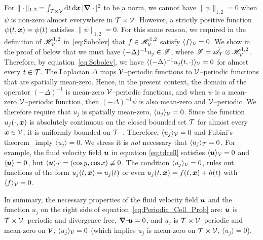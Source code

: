 \documentclass[amsa]{ipart}
\begin{document}
For $\|\cdot\|_{1,2}=\int_{\mathcal{T}\times\mathcal{V}}\mathrm{d} t\,\mathrm{d}\boldsymbol{x}\,|\mbox{\boldmath${\nabla}$}\cdot|^2$ to be a norm,
we cannot have $\|\psi\|_{1,2}=0$ 
when $\psi$ is non-zero almost everywhere in $\mathcal{T}\times\mathcal{V}$. However, a
strictly positive function $\psi(t,\boldsymbol{x})=\psi(t)$ satisfies
$\|\psi\|_{1,2}=0$. For this same reason, we required in the definition of
$\mathscr{H}^{1,2}_{\mathcal{V}}$ in~\eqref{eq:Sobolev} that $f\in\mathscr{H}^{1,2}_{\mathcal{V}}$
satisfy $\langle f\rangle_{\mathcal{V}}=0$.  We show in the proof of
 below that we must have $(-\Delta)^{-1}u_j\in\mathscr{F}$, 
where $\mathscr{F}=\tilde{\mathscr{A}}_{\mathcal{T}}\otimes\mathscr{H}^{1,2}_{\mathcal{V}}$. Therefore, by
equation~\eqref{eq:Sobolev}, we have $\langle(-\Delta)^{-1}u_j(t,\cdot)\rangle_{\mathcal{V}}=0$ for
almost every $t\in\mathcal{T}$. The Laplacian $\Delta$ maps $\mathcal{V}$--periodic functions
to $\mathcal{V}$--periodic functions that are spatially mean-zero. Hence, in
the 
present context, the domain of the operator $(-\Delta)^{-1}$ is mean-zero
$\mathcal{V}$--periodic functions, and when $\psi$ is a mean-zero $\mathcal{V}$--periodic
function, then $(-\Delta)^{-1}\psi$ is also mean-zero and
$\mathcal{V}$--periodic. We therefore require that $u_j$ is spatially
mean-zero, $\langle u_j\rangle_{\mathcal{V}}=0$. Since the function $u_j(\cdot,\boldsymbol{x})$ is
absolutely continuous on the closed bounded set $\mathcal{T}$ for almost every
$\boldsymbol{x}\in\mathcal{V}$, it is uniformly bounded on $\mathcal{T}$~\cite{BabyRudin:64}. Therefore, $\langle u_j\rangle_{\mathcal{V}}=0$ and
Fubini's theorem~\cite{Folland:99:RealAnalysis} imply $\langle u_j\rangle=0$. We
stress it is \emph{not} necessary that $\langle u_j\rangle_{\mathcal{T}}=0$. For
example, the fluid velocity field $\boldsymbol{u}$ in equation
\eqref{eq:tdcell} satisfies $\langle\boldsymbol{u}\rangle_{\mathcal{V}}=0$ and $\langle\boldsymbol{u}\rangle=0$, but
$\langle\boldsymbol{u}\rangle_{\mathcal{T}}=(\cos{y},\cos{x})\not\equiv0$. The condition
$\langle u_j\rangle_{\mathcal{V}}=0$, rules out functions of the form $u_j(t,\boldsymbol{x})=u_j(t)$
or even $u_j(t,\boldsymbol{x})=f(t,\boldsymbol{x})+h(t)$ with $\langle f\rangle_{\mathcal{V}}=0$.        



In summary, the necessary properties of the fluid velocity field
$\boldsymbol{u}$ and the function $u_j$ on the right side of
equation~\eqref{eq:Periodic_Cell_Prob} are: $\boldsymbol{u}$ is
$\mathcal{T}\times\mathcal{V}$--periodic and divergence free, $\mbox{\boldmath${\nabla}$}\mbox{\boldmath${\cdot}$}\boldsymbol{u}=0$, and
$u_j$ is $\mathcal{T}\times\mathcal{V}$--periodic and mean-zero on $\mathcal{V}$, $\langle u_j\rangle_{\mathcal{V}}=0$
(which implies $u_j$ is  mean-zero on $\mathcal{T}\times\mathcal{V}$, $\langle u_j\rangle=0$). 
\end{document}
